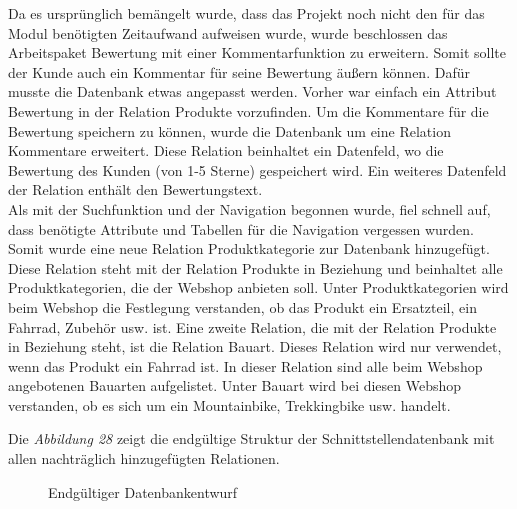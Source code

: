 Da es ursprünglich bemängelt wurde, dass das Projekt noch nicht den für das Modul benötigten Zeitaufwand aufweisen wurde, wurde beschlossen das Arbeitspaket \glqq Bewertung\grqq{} mit einer Kommentarfunktion zu erweitern. Somit sollte der Kunde auch ein Kommentar für seine Bewertung äußern können. Dafür musste die Datenbank etwas angepasst werden. Vorher war einfach ein Attribut \glqq Bewertung\grqq{} in der Relation \glqq Produkte\grqq{} vorzufinden. Um die Kommentare für die Bewertung speichern zu können, wurde die Datenbank um eine Relation \glqq Kommentare\grqq{} erweitert. Diese Relation beinhaltet ein Datenfeld, wo die Bewertung des Kunden (von 1-5 Sterne) gespeichert wird. Ein weiteres Datenfeld der Relation enthält den Bewertungstext. \\
Als mit der Suchfunktion und der Navigation begonnen wurde, fiel schnell auf, dass benötigte Attribute und Tabellen für die Navigation vergessen wurden. Somit wurde eine neue Relation \glqq Produktkategorie\grqq{} zur Datenbank hinzugefügt. Diese Relation steht mit der Relation \glqq Produkte\grqq{} in Beziehung und beinhaltet alle Produktkategorien, die der Webshop anbieten soll. Unter Produktkategorien wird beim Webshop die Festlegung verstanden, ob das Produkt ein Ersatzteil, ein Fahrrad, Zubehör usw. ist. Eine zweite Relation, die mit der Relation Produkte in Beziehung steht, ist die Relation \glqq Bauart\grqq{}. Dieses Relation wird nur verwendet, wenn das Produkt ein Fahrrad ist. In dieser Relation sind alle beim Webshop angebotenen Bauarten aufgelistet. Unter Bauart wird bei diesen Webshop verstanden, ob es sich um ein Mountainbike, Trekkingbike usw. handelt.

Die \textit{Abbildung 28} zeigt die endgültige Struktur der Schnittstellendatenbank mit allen nachträglich hinzugefügten Relationen. 
\begin{figure}[H]
	\begin{center}
	\end{center}
	\caption{Endgültiger Datenbankentwurf}
\end{figure}

